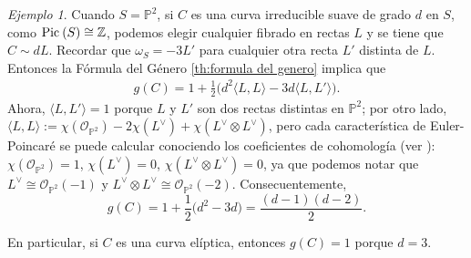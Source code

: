 \documentclass[spanish,12pt]{amsart}
\newcommand{\Pic}[1]{\textup{Pic}{ \: (#1)}}
\theoremstyle{definition}
\theoremstyle{remark}
\newtheorem{example}[theorem]{Ejemplo}
\numberwithin{equation}{section}
\newcommand{\integers}{\mathbb{Z}}
\renewcommand{\O}{\mathcal{O}}
\begin{document}
\begin{example}
Cuando $S = \mathbb{P}^2$, si $C$ es una curva irreducible suave de grado $d$ en $S$, como $\Pic S \cong \integers$, podemos elegir cualquier fibrado en rectas $L$ y se tiene que $C \sim d L$. Recordar que $\omega_S = -3 L'$ para cualquier otra recta $L'$ distinta de $L$. Entonces la Fórmula del Género \ref{th:formula del genero} implica que
\begin{align*}
g(C) = 1 + \frac 1 2 \big ( d^2 \langle L, L \rangle - 3 d \langle L, L' \rangle \big ).
\end{align*}
Ahora, $\langle L, L' \rangle = 1$ porque $L$ y $L'$ son dos rectas distintas en $\mathbb{P}^2$; por otro lado, $\langle L, L \rangle := \chi (\O_{\mathbb{P}^2}) - 2 \chi (L^\vee) + \chi (L^\vee \otimes L^\vee)$, pero cada característica de Euler-Poincaré se puede calcular conociendo los coeficientes de cohomología (ver \cite[Teorema 4.2.1]{notas_pedro}): $\chi (\O_{\mathbb{P}^2}) = 1$, $\chi (L^\vee) = 0$, $\chi (L^\vee \otimes L^\vee) = 0$, ya que podemos notar que $L^\vee \cong \O_{\mathbb{P}^2} (-1)$ y $L^\vee \otimes L^\vee \cong \O_{\mathbb{P}^2} (-2)$. Consecuentemente,
\[
    g(C) = 1 + \frac 1 2 \big ( d^2 - 3d \big) = \frac{(d-1)(d-2)}{2}.
\]

En particular, si $C$ es una curva elíptica, entonces $g(C) = 1$ porque $d = 3$.
\end{example}







\end{document}
